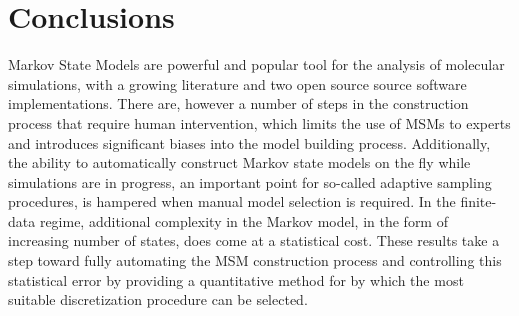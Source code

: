\documentclass[twocolumn,floatfix,nofootinbib,aps]{revtex4-1}
\begin{document}
\section{Conclusions}

Markov State Models are powerful and popular tool for the analysis of molecular simulations, with a growing literature and two open source source software implementations\cite{Beauchamp2011Msmbuilder2, Senne2012EMMA}. There are, however a number of steps in the construction process that require human intervention, which limits the use of MSMs to experts and introduces significant biases into the model building process. Additionally, the ability to automatically construct Markov state models on the fly while simulations are in progress, an important point for so-called adaptive sampling procedures\cite{Bowman2010Enhanced}, is hampered when manual model selection is required. In the finite-data regime, additional complexity in the Markov model, in the form of increasing number of states, does come at a statistical cost.
These results take a step toward fully automating the MSM construction process and controlling this statistical error by providing a quantitative method for by which the most suitable discretization procedure can be selected.


\end{document}
